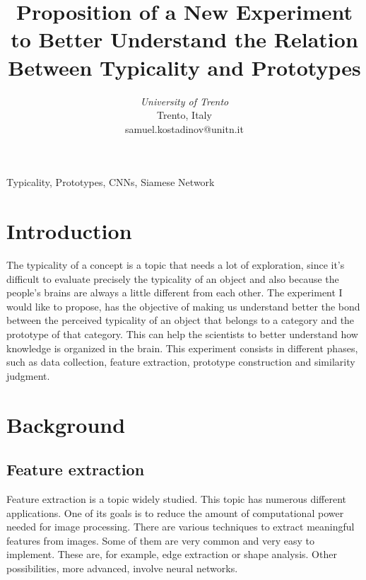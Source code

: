 \documentclass[conference]{IEEEtran}
\begin{document}
\title{Proposition of a New Experiment to Better Understand the Relation Between Typicality and Prototypes}


\author{
\textit{University of Trento}\\
Trento, Italy \\
samuel.kostadinov@unitn.it}


\maketitle

\begin{abstract}

	\lipsum[1]
	
\end{abstract}

\begin{IEEEkeywords}
Typicality, Prototypes, CNNs, Siamese Network
\end{IEEEkeywords}


\section{Introduction}
	
	The typicality of a concept is a topic that needs a lot of exploration, since it's difficult to evaluate precisely the typicality of an object 
	and also because the people's brains are always a little different from each other. The experiment I would like to propose, has the objective of 
	making us understand better the bond between the perceived typicality of an object that belongs to a category and the prototype of that category.
	This can help the scientists to better understand how knowledge is organized in the brain. This experiment consists in different phases, such as
	data collection, feature extraction, prototype construction and similarity judgment.


\section{Background}

	\subsection{Feature extraction}

		Feature extraction is a topic widely studied. 
		This topic has numerous different applications. 
		One of its goals is to reduce the amount of computational power needed for image processing. 
		There are various techniques to extract meaningful features from images. 
		Some of them are very common and very easy to implement. 
		These are, for example, edge extraction or shape analysis. 
		Other possibilities, more advanced, involve neural networks.\\
\end{document}
